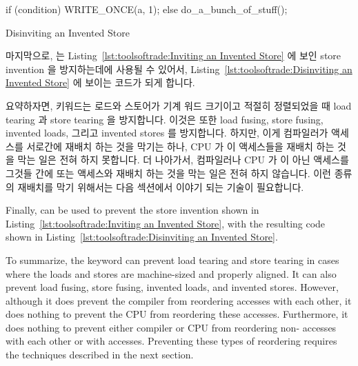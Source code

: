 \fi

\begin{listing}[tbp]
\begin{fcvlabel}
\begin{VerbatimL}[commandchars=\\\{\}]
if (condition)
	WRITE_ONCE(a, 1);
else
	do_a_bunch_of_stuff();
\end{VerbatimL}
\end{fcvlabel}
\caption{Disinviting an Invented Store}
\label{lst:toolsoftrade:Disinviting an Invented Store}
\end{listing}

마지막으로,  는
Listing~\ref{lst:toolsoftrade:Inviting an Invented Store} 에 보인 store
invention 을 방지하는데에 사용될 수 있어서,
Listing~\ref{lst:toolsoftrade:Disinviting an Invented Store} 에 보이는 코드가
되게 합니다.

요약하자면,  키워드는 로드와 스토어가 기계 워드 크기이고 적절히
정렬되었을 때 load tearing 과 store tearing 을 방지합니다.
이것은 또한 load fusing, store fusing, invented loads, 그리고 invented stores
를 방지합니다.
하지만, 이게 컴파일러가  액세스를 서로간에 재배치 하는 것을
막기는 하나, CPU 가 이 액세스들을 재배치 하는 것을 막는 일은 전혀 하지
못합니다.
더 나아가서, 컴파일러나 CPU 가  이 아닌 액세스를 그것들 간에 또는
 액세스와 재배치 하는 것을 막는 일은 전혀 하지 않습니다.
이런 종류의 재배치를 막기 위해서는 다음 섹션에서 이야기 되는 기술이 필요합니다.

\iffalse

Finally,  can be used to prevent the store invention
shown in
Listing~\ref{lst:toolsoftrade:Inviting an Invented Store},
with the resulting code shown in
Listing~\ref{lst:toolsoftrade:Disinviting an Invented Store}.

To summarize, the  keyword can prevent load
tearing and store tearing in cases where the loads and stores are
machine-sized and properly aligned.
It can also prevent load fusing, store fusing, invented loads, and
invented stores.
However, although it does prevent the compiler from reordering 
accesses with each other, it does nothing to prevent the
CPU from reordering these accesses.
Furthermore, it does nothing to prevent either compiler or CPU from
reordering non- accesses with each other or with
 accesses.
Preventing these types of reordering requires the techniques described
in the next section.

